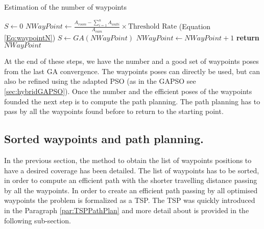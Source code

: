 \begin{algorithm}{}
\caption{Estimation of the number of waypoints}\label{alg:euclid}
\begin{algorithmic}[6]
 \State $S\gets 0$
  \State $NWayPoint\gets \frac{ A_{room} - \sum_{i=1}^n A_{wall i} }{A_{cam}} \times \mbox{Threshold Rate} 
 $  (Equation \ref{Eq:waypointN})
	 \State $S \gets GA(NWayPoint)$
	  \State $NWayPoint\gets NWayPoint+1$
  \EndWhile\label{endwhile}
\State \textbf{return} $NWayPoint$
\EndProcedure
\end{algorithmic}
\end{algorithm}

At the end of these steps, we have the number and a good set of waypoints poses from the last GA convergence. The waypoints poses can directly be used, but can also be refined using the adapted PSO (as in the GAPSO see \ref{sec:hybridGAPSO}). Once the number and the efficient poses of the waypoints founded the next step is to compute the path planning. The path planning has to pass by all the waypoints found before to return to the starting point.  
	
 
  \subsection{Sorted waypoints and path planning.} \label{sec:sorted}
In the previous section, the method to obtain the list of waypoints positions to have a desired coverage has been detailed. The list of waypoints has to be sorted, in order to compute an efficient path with the shorter travelling distance passing by all the waypoints. In order to create an efficient path passing by all optimised waypoints the problem is formalized as a TSP. The TSP was quickly introduced in the Paragraph \ref{par:TSPPathPlan} and more detail about is provided in the following sub-section.


